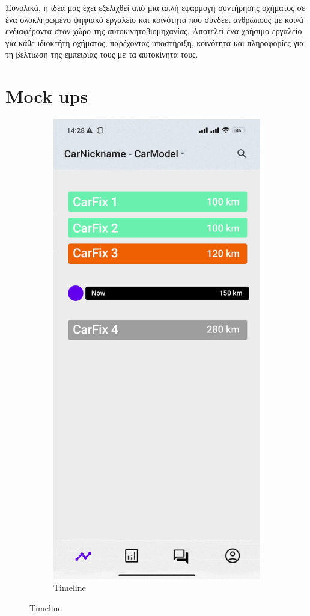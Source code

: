 \documentclass[11pt]{scrartcl} %
\begin{document}
Συνολικά, η ιδέα μας έχει εξελιχθεί από μια απλή εφαρμογή συντήρησης οχήματος σε ένα ολοκληρωμένο ψηφιακό εργαλείο και κοινότητα που συνδέει ανθρώπους με κοινά ενδιαφέροντα στον χώρο της αυτοκινητοβιομηχανίας. Αποτελεί ένα χρήσιμο εργαλείο για κάθε ιδιοκτήτη οχήματος, παρέχοντας υποστήριξη, κοινότητα και πληροφορίες για τη βελτίωση της εμπειρίας τους με τα αυτοκίνητα τους.

\pagebreak

\section{Mock ups \cite{materialdesign}}

\begin{figure}[!htb]
\begin{subfigure}{.5\textwidth}
  \centering
  \includegraphics[width=.6\linewidth]{assets/timeline_mock_up.jpg}
  \caption{Timeline}
  \label{fig:sfig1}
\end{subfigure}%

\end{figure}
\end{document}
